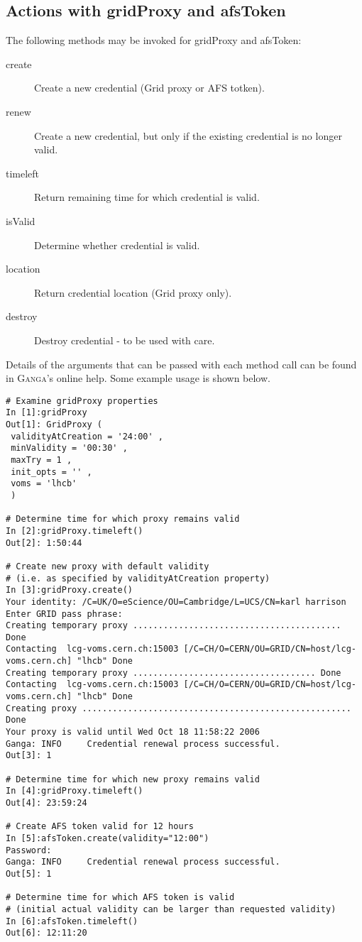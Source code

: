 \documentclass{howto}
\def\ganga {\textsc{Ganga}\xspace}
\begin{document}
\subsection{Actions with gridProxy and afsToken}

The following methods may be invoked for gridProxy and afsToken:

\begin{description}
\item[create] Create a new credential (Grid proxy or AFS totken).
\item[renew] Create a new credential, but only if the existing credential
is no longer valid.
\item[timeleft] Return remaining time for which credential is valid.
\item[isValid] Determine whether credential is valid.
\item[location] Return credential location (Grid proxy only).
\item[destroy] Destroy credential - to be used with care.
\end{description}

Details of the arguments that can be passed with each method call can be
found in \ganga's online help.  Some example usage is shown below.

\begin{verbatim}
# Examine gridProxy properties
In [1]:gridProxy 
Out[1]: GridProxy (
 validityAtCreation = '24:00' ,
 minValidity = '00:30' ,
 maxTry = 1 ,
 init_opts = '' ,
 voms = 'lhcb'
 )

# Determine time for which proxy remains valid
In [2]:gridProxy.timeleft()
Out[2]: 1:50:44 

# Create new proxy with default validity
# (i.e. as specified by validityAtCreation property)
In [3]:gridProxy.create()
Your identity: /C=UK/O=eScience/OU=Cambridge/L=UCS/CN=karl harrison
Enter GRID pass phrase:
Creating temporary proxy ......................................... Done
Contacting  lcg-voms.cern.ch:15003 [/C=CH/O=CERN/OU=GRID/CN=host/lcg-voms.cern.ch] "lhcb" Done
Creating temporary proxy .................................... Done
Contacting  lcg-voms.cern.ch:15003 [/C=CH/O=CERN/OU=GRID/CN=host/lcg-voms.cern.ch] "lhcb" Done
Creating proxy ..................................................... Done
Your proxy is valid until Wed Oct 18 11:58:22 2006
Ganga: INFO     Credential renewal process successful.
Out[3]: 1

# Determine time for which new proxy remains valid
In [4]:gridProxy.timeleft()
Out[4]: 23:59:24

# Create AFS token valid for 12 hours
In [5]:afsToken.create(validity="12:00")
Password:
Ganga: INFO     Credential renewal process successful.
Out[5]: 1

# Determine time for which AFS token is valid
# (initial actual validity can be larger than requested validity) 
In [6]:afsToken.timeleft()
Out[6]: 12:11:20
\end{verbatim}
\end{document}
